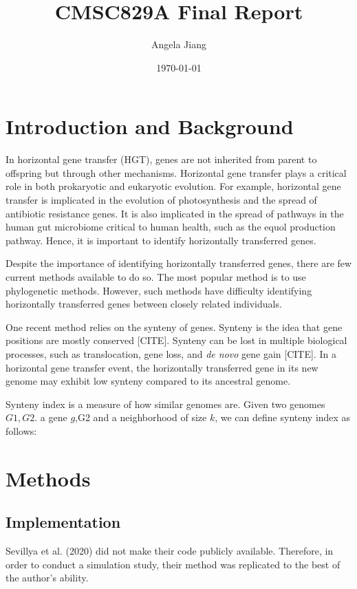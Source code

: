 \documentclass{article}
\title{CMSC829A Final Report}
\author{Angela Jiang }
\date{\today}
\begin{document}

\maketitle

\section{Introduction and Background}

In horizontal gene transfer (HGT), genes are not inherited from parent to offspring but through other mechanisms. Horizontal gene transfer plays a critical role in both prokaryotic and eukaryotic evolution. For example, horizontal gene transfer is implicated in the evolution of photosynthesis and the spread of antibiotic resistance genes. It is also implicated in the spread of pathways in the human gut microbiome critical to human health, such as the equol production pathway. Hence, it is important to identify horizontally transferred genes. 

Despite the importance of identifying horizontally transferred genes, there are few current methods available to do so. The most popular method is to use phylogenetic methods. However, such methods have difficulty identifying horizontally transferred genes between closely related individuals.

One recent method relies on the synteny of genes. Synteny is the idea that gene positions are mostly conserved [CITE]. Synteny can be lost in multiple biological processes, such as translocation, gene loss, and \textit{de novo} gene gain [CITE]. In a horizontal gene transfer event, the horizontally transferred gene in its new genome may exhibit low synteny compared to its ancestral genome.

Synteny index is a measure of how similar genomes are. Given two genomes $G1,G2 $. a gene $g$,G2 and a neighborhood of size $k$, we can define synteny index as follows:




\section{Methods}
\subsection{Implementation}
Sevillya et al. (2020) did not make their code publicly available. Therefore, in order to conduct a simulation study, their method was replicated to the best of the author's ability.
\end{document}
